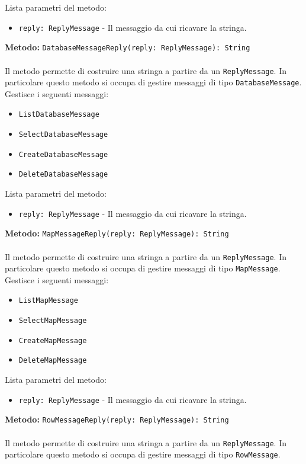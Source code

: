\documentclass[a4paper]{article}
\begin{document}
			Lista parametri del metodo:
			\begin{itemize}
				\item \texttt{reply: ReplyMessage} - Il messaggio da cui ricavare la stringa.
			\end{itemize}
		\textbf{Metodo: }\texttt{DatabaseMessageReply(reply: ReplyMessage): String}
			\\ \\
			Il metodo permette di costruire una stringa a partire da un \texttt{ReplyMessage}. In particolare questo metodo si occupa di gestire messaggi di tipo \texttt{DatabaseMessage}.
			Gestisce i seguenti messaggi:
			\begin{itemize}
				\item \texttt{ListDatabaseMessage}
				\item \texttt{SelectDatabaseMessage}
				\item \texttt{CreateDatabaseMessage}
				\item \texttt{DeleteDatabaseMessage}
			\end{itemize}
			Lista parametri del metodo:
			\begin{itemize}
				\item \texttt{reply: ReplyMessage} - Il messaggio da cui ricavare la stringa.
			\end{itemize}
		\textbf{Metodo: }\texttt{MapMessageReply(reply: ReplyMessage): String}
			\\ \\
			Il metodo permette di costruire una stringa a partire da un \texttt{ReplyMessage}. In particolare questo metodo si occupa di gestire messaggi di tipo \texttt{MapMessage}.
			Gestisce i seguenti messaggi:
			\begin{itemize}
				\item \texttt{ListMapMessage}
				\item \texttt{SelectMapMessage}
				\item \texttt{CreateMapMessage}
				\item \texttt{DeleteMapMessage}
			\end{itemize}
			Lista parametri del metodo:
			\begin{itemize}
				\item \texttt{reply: ReplyMessage} - Il messaggio da cui ricavare la stringa.
			\end{itemize}
		\textbf{Metodo: }\texttt{RowMessageReply(reply: ReplyMessage): String}
			\\ \\
			Il metodo permette di costruire una stringa a partire da un \texttt{ReplyMessage}. In particolare questo metodo si occupa di gestire messaggi di tipo \texttt{RowMessage}.
\end{document}
